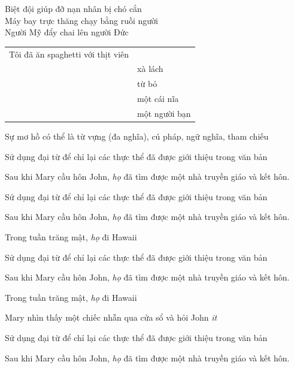 \documentclass{article}
\begin{document}
\begin{huge}
Biệt đội giúp đỡ nạn nhân bị chó cắn \\
Máy bay trực thăng chạy bằng ruồi người\\
Người Mỹ đẩy chai lên người Đức\\
\begin{tabular}{ll}Tôi đã ăn spaghetti với thịt viên \\
                                        & xà lách \\
                                        & từ bỏ \\
                                        & một cái nĩa \\
                                        & một người bạn 
\end{tabular}

Sự mơ hồ có thể là từ vựng (đa nghĩa), cú pháp, ngữ nghĩa, tham chiếu



Sử dụng đại từ để chỉ lại các thực thể đã được giới thiệu trong văn bản

Sau khi Mary cầu hôn John, \emph{họ} đã tìm được một nhà truyền giáo và kết hôn.


Sử dụng đại từ để chỉ lại các thực thể đã được giới thiệu trong văn bản

Sau khi Mary cầu hôn John, \emph{họ} đã tìm được một nhà truyền giáo và kết hôn.

Trong tuần trăng mật, \emph{họ} đi Hawaii



Sử dụng đại từ để chỉ lại các thực thể đã được giới thiệu trong văn bản

Sau khi Mary cầu hôn John, \emph{họ} đã tìm được một nhà truyền giáo và kết hôn.

Trong tuần trăng mật, \emph{họ} đi Hawaii

Mary nhìn thấy một chiếc nhẫn qua cửa sổ và hỏi John \emph{it}



Sử dụng đại từ để chỉ lại các thực thể đã được giới thiệu trong văn bản

Sau khi Mary cầu hôn John, \emph{họ} đã tìm được một nhà truyền giáo và kết hôn.


\end{huge}
\end{document}
